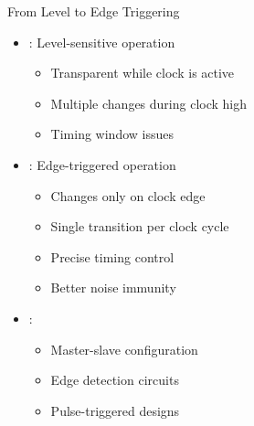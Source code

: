 \begin{frame}{From Level to Edge Triggering}
\begin{itemize}
\item {}: Level-sensitive operation
\begin{itemize}
\item Transparent while clock is active
\item Multiple changes during clock high
\item Timing window issues
\end{itemize}
\vspace{0.5cm}
\item {}: Edge-triggered operation
\begin{itemize}
\item Changes only on clock edge
\item Single transition per clock cycle
\item Precise timing control
\item Better noise immunity
\end{itemize}
\vspace{0.3cm}
\item {}:
\begin{itemize}
\item Master-slave configuration
\item Edge detection circuits
\item Pulse-triggered designs
\end{itemize}
\end{itemize}
\end{frame}
